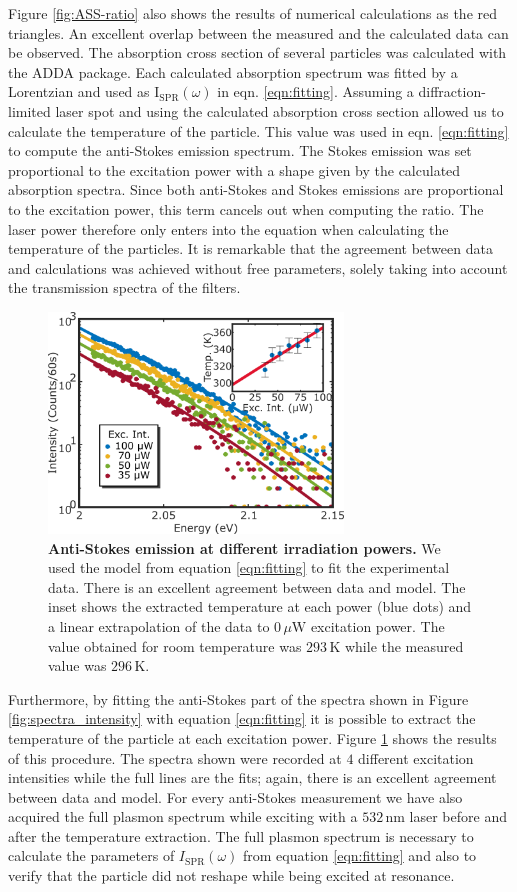 \documentclass[journal=nalefd,manuscript=letter]{achemso}
\newcommand{\K}{\ensuremath{\,\textrm{K}}}
\newcommand{\nm}{\ensuremath{\,\textrm{nm}}}
\newcommand{\uW}{\ensuremath{\,\mu\textrm{W}}}
\begin{document}
Figure \ref{fig:ASS-ratio} also shows the results of numerical calculations as the red
triangles. An excellent overlap between the measured and the calculated data can
be observed. The absorption cross section of several particles was calculated
with the ADDA package\cite{Yurkin2011}. Each calculated absorption spectrum was
fitted by a Lorentzian and used as $\textrm{I}_{\textrm{SPR}}(\omega)$ in eqn.
\ref{eqn:fitting}. Assuming a diffraction-limited laser spot and using the
calculated absorption cross section allowed us to calculate the temperature of
the particle. This value was used in eqn. \ref{eqn:fitting} to compute the
anti-Stokes emission spectrum. The Stokes emission was set proportional to the
excitation power  with a shape given by the calculated absorption spectra. Since both
anti-Stokes and Stokes emissions are proportional to the excitation power, this
term cancels out when computing the ratio. The laser power therefore only enters
into the equation when calculating the temperature of the particles. It is
remarkable that the agreement between data and calculations was achieved
without free parameters, solely taking into account the transmission spectra of
the filters.

\begin{figure}[tp] \centering
\includegraphics[width=78.4mm]{Figures/03_Fit_Of_AS/03_Log_Fit_AS.png}
\caption{\textbf{Anti-Stokes emission at different irradiation powers.} We used 
the model from equation \ref{eqn:fitting} to fit the experimental data. 
There is an excellent agreement between data and model. The inset shows the extracted
temperature at each power (blue dots) and a linear 
extrapolation of the data to $0\uW$ excitation power.
The value obtained for room temperature was $293\K$ while the measured value was
$296\K$.}
	\label{fig:AS_in_Log}
\end{figure}

Furthermore, by fitting the anti-Stokes part of the spectra shown in Figure
\ref{fig:spectra_intensity} with equation \ref{eqn:fitting} it is possible to extract
the temperature of the particle at each excitation power. Figure
\ref{fig:AS_in_Log} shows the results of this procedure. The spectra shown were
recorded at $4$ different excitation intensities while the full lines are the
fits; again, there is an excellent agreement between data and model. For every
anti-Stokes measurement we have also acquired the full plasmon spectrum while
exciting with a $532\nm$ laser before and after the temperature extraction.
The full plasmon spectrum is necessary to calculate the parameters of
$I_\textrm{SPR}(\omega)$ from equation \ref{eqn:fitting} and also to verify that the
particle did not reshape while being excited at resonance. 
\end{document}
